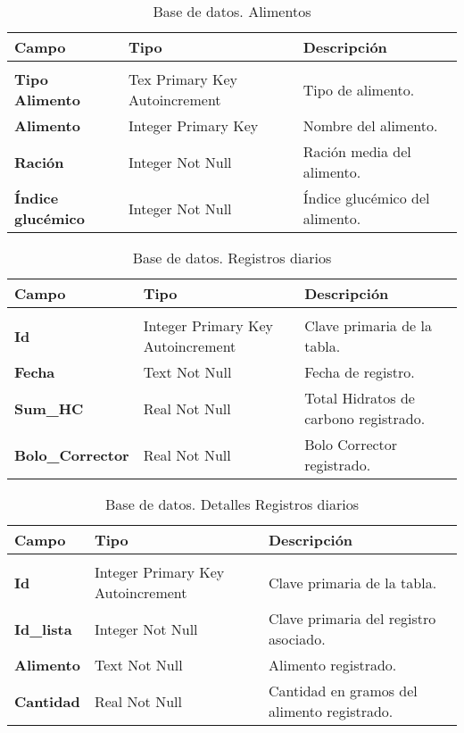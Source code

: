 \begin{table}[]
	\centering
	\caption{Base de datos. Alimentos}
	\label{tabla:BDAlimentos}
	\begin{tabular}{l p{4cm} p{4cm}}
	\toprule
	\textbf{Campo}     &\textbf{Tipo} 				& \textbf{Descripción} 		\\ 	\midrule    \\ 	
	\textbf{Tipo Alimento} & Tex Primary Key Autoincrement  	& Tipo de alimento.\\ 
	\textbf{Alimento}	   & Integer Primary Key			 	& Nombre del alimento.\\
	\textbf{Ración}        & Integer Not Null				    & Ración media del alimento.\\  
	\textbf{Índice glucémico}  & Integer Not Null				& Índice glucémico del alimento.                	   
\\ \bottomrule
\end{tabular}
\end{table}
\begin{table}[]
	\centering
	\caption{Base de datos. Registros diarios}
	\label{tabla:BDRegistrosDiarios}
	\rowcolors {2}{gray!35}{}
	\begin{tabular}{l p{4cm} p{4cm}}
	\toprule
	\textbf{Campo}     &\textbf{Tipo} 				& \textbf{Descripción} 		\\ 	\midrule    \\ 	
	\textbf{Id} 	   & Integer Primary Key Autoincrement  	& Clave primaria de la tabla.    \\ 
	\textbf{Fecha}     & Text Not Null					 		& Fecha de registro.\\
	\textbf{Sum\_HC}    & Real Not Null				    		& Total Hidratos de carbono registrado.\\  
	\textbf{Bolo\_Corrector}  & Real Not Null					& Bolo Corrector registrado.                	   
\\ \bottomrule
\end{tabular}
\end{table}
\begin{table}[]
	\centering
	\caption{Base de datos. Detalles Registros diarios}
	\label{tabla:BDDetallesRegistrosDiarios}
	\begin{tabular}{l p{4cm} p{4cm}}
	\toprule
	\textbf{Campo}     &\textbf{Tipo} 				& \textbf{Descripción} 		\\ 	\midrule    \\ 	
	\textbf{Id} 	   & Integer Primary Key Autoincrement  	& Clave primaria de la tabla.    \\ 
	\textbf{Id\_lista}  & Integer Not Null					 	& Clave primaria del registro asociado. \\
	\textbf{Alimento}  & Text Not Null				    		& Alimento registrado.     \\  
	\textbf{Cantidad}  & Real Not Null							& Cantidad en gramos del alimento registrado.                	   
\\ \bottomrule
\end{tabular}
\end{table}

